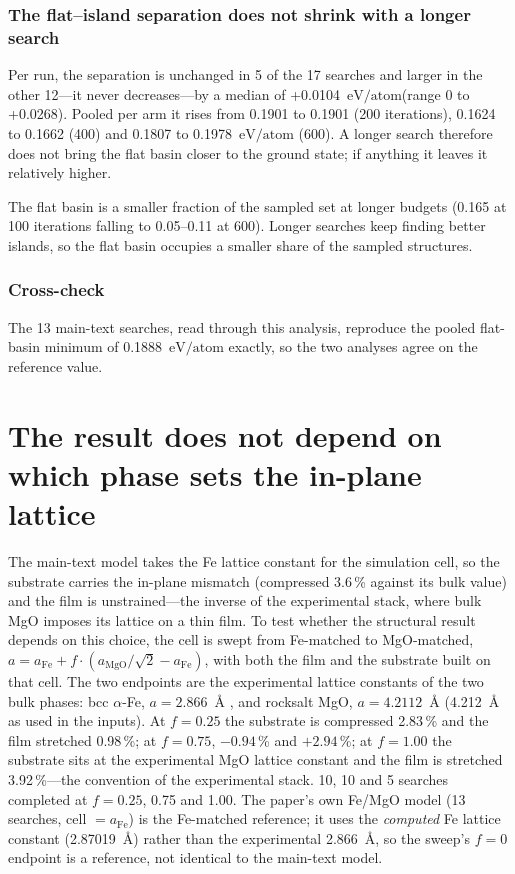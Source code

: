 \documentclass[10pt]{article}
\newcommand{\eVA}{\ensuremath{\text{eV/atom}}}
\begin{document}
\subsubsection{The flat--island separation does not shrink with a longer search} Per run, the separation is
unchanged in 5 of the 17 searches and larger in the other 12---it never decreases---by a median of
+0.0104~\eVA (range 0 to +0.0268). Pooled per arm it rises from 0.1901 to 0.1901
(200 iterations), 0.1624 to 0.1662 (400) and 0.1807 to 0.1978~\eVA{} (600). A longer search therefore
does not bring the flat basin closer to the ground state; if anything it leaves it relatively higher.


The flat basin is a smaller fraction of the sampled set at longer budgets (0.165 at 100
iterations falling to 0.05--0.11 at 600). Longer searches keep finding better islands, so the flat
basin occupies a smaller share of the sampled structures.

\subsubsection{Cross-check} The 13 main-text searches, read through this analysis, reproduce the pooled
flat-basin minimum of 0.1888~\eVA{} exactly, so the two analyses agree on the reference value.

\section{The result does not depend on which phase sets the in-plane lattice}
\label{sec:S5}

The main-text model takes the Fe lattice constant for the simulation cell, so the substrate
carries the in-plane mismatch (compressed 3.6\,\% against its bulk value) and the film is
unstrained---the inverse of the experimental stack, where bulk MgO imposes its lattice on a thin
film. To test whether the structural result depends on this choice, the cell is swept from
Fe-matched to MgO-matched, $a = a_\mathrm{Fe} + f\cdot(a_\mathrm{MgO}/\sqrt{2} - a_\mathrm{Fe})$,
with both the film and the substrate built on that cell. The two endpoints are the
experimental lattice constants of the two bulk phases: bcc $\alpha$-Fe, $a = 2.866$~\AA{}
\cite{pietrokowsky1966}, and rocksalt MgO, $a = 4.2112$~\AA{} \cite{swanson1953} (4.212~\AA{} as used
in the inputs). At $f = 0.25$ the substrate is compressed 2.83\,\% and the film stretched 0.98\,\%;
at $f = 0.75$, $-0.94$\,\% and $+2.94$\,\%; at $f = 1.00$ the substrate sits at the experimental MgO
lattice constant and the film is stretched 3.92\,\%---the convention of the experimental stack. 10,
10 and 5 searches completed at $f = 0.25$, 0.75 and 1.00. The paper's own Fe/MgO model (13 searches,
cell $= a_\mathrm{Fe}$) is the Fe-matched reference; it uses the \emph{computed} Fe lattice constant
(2.87019~\AA) rather than the experimental 2.866~\AA, so the sweep's $f = 0$ endpoint is a reference,
not identical to the main-text model.
\end{document}
